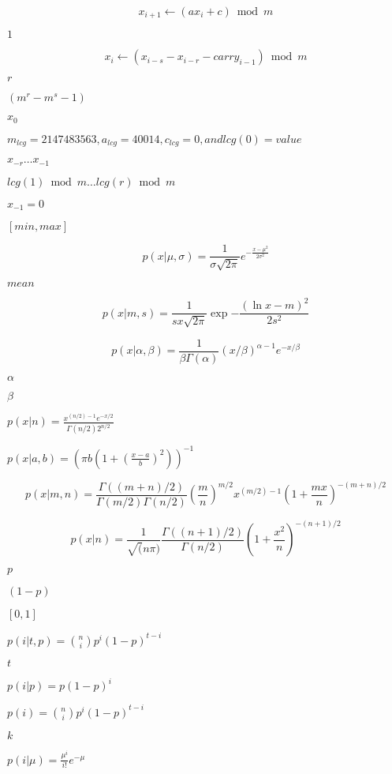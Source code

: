 \documentclass{article}
\begin{document}
\[ x_{i+1}\leftarrow(ax_{i} + c) \bmod m \]
\pagebreak

$1$
\pagebreak

\[ x_{i}\leftarrow(x_{i - s} - x_{i - r} - carry_{i-1}) \bmod m \]
\pagebreak

$r$
\pagebreak

$(m^r - m^s - 1)$
\pagebreak

$x_0$
\pagebreak

$ m_{lcg} = 2147483563, a_{lcg} = 40014, c_{lcg} = 0, and lcg(0) = value $
\pagebreak

$ x_{-r} \dots x_{-1} $
\pagebreak

$ lcg(1) \bmod m \dots lcg(r) \bmod m $
\pagebreak

$ x_{-1} = 0 $
\pagebreak

$[min, max]$
\pagebreak

\[ p(x|\mu,\sigma) = \frac{1}{\sigma \sqrt{2 \pi}} e^{- \frac{{x - \mu}^ {2}}{2 \sigma ^ {2}} } \]
\pagebreak

$mean$
\pagebreak

\[ p(x|m,s) = \frac{1}{sx\sqrt{2\pi}} \exp{-\frac{(\ln{x} - m)^2}{2s^2}} \]
\pagebreak

\[ p(x|\alpha,\beta) = \frac{1}{\beta\Gamma(\alpha)} (x/\beta)^{\alpha - 1} e^{-x/\beta} \]
\pagebreak

$\alpha$
\pagebreak

$\beta$
\pagebreak

$p(x|n) = \frac{x^{(n/2) - 1}e^{-x/2}}{\Gamma(n/2) 2^{n/2}}$
\pagebreak

$p(x|a,b) = (\pi b (1 + (\frac{x-a}{b})^2))^{-1}$
\pagebreak

\[ p(x|m,n) = \frac{\Gamma((m+n)/2)}{\Gamma(m/2)\Gamma(n/2)} (\frac{m}{n})^{m/2} x^{(m/2)-1} (1 + \frac{mx}{n})^{-(m+n)/2} \]
\pagebreak

\[ p(x|n) = \frac{1}{\sqrt(n\pi)} \frac{\Gamma((n+1)/2)}{\Gamma(n/2)} (1 + \frac{x^2}{n}) ^{-(n+1)/2} \]
\pagebreak

$p$
\pagebreak

$(1 - p)$
\pagebreak

$[0, 1]$
\pagebreak

$p(i|t,p) = \binom{n}{i} p^i (1 - p)^{t - i}$
\pagebreak

$t$
\pagebreak

$p(i|p) = p(1 - p)^{i}$
\pagebreak

$p(i) = \binom{n}{i} p^i (1 - p)^{t - i}$
\pagebreak

$k$
\pagebreak

$p(i|\mu) = \frac{\mu^i}{i!} e^{-\mu}$
\pagebreak
\end{document}
